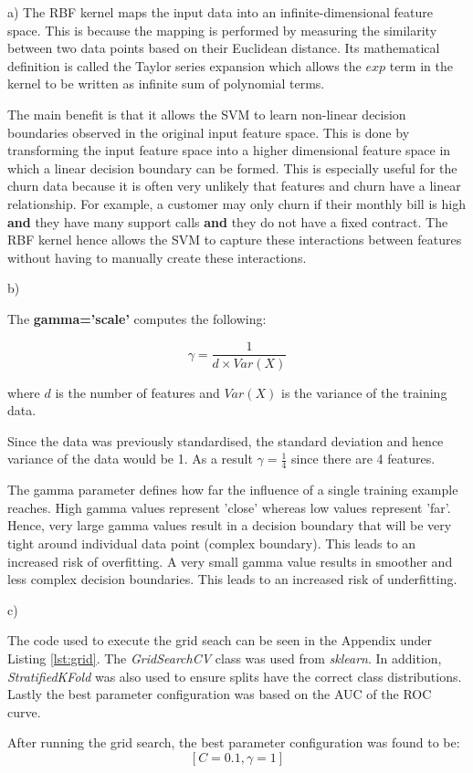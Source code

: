 \begin{partquestion2}{a)} The RBF kernel maps the input data into an infinite-dimensional feature space. This is because
the mapping is performed by measuring the similarity between two data points based on their
Euclidean distance. Its mathematical definition is called the Taylor series expansion which allows
the $exp$ term in the kernel to be written as infinite sum of polynomial terms.

The main benefit is that it allows the SVM to learn non-linear decision boundaries observed in the
original input feature space. This is done by transforming the input feature space into a higher
dimensional feature space in which a linear decision boundary can be formed. This is especially
useful for the churn data because it is often very unlikely that features and churn have a 
linear relationship. For example, a customer may only churn if their monthly bill is high \textbf{and}
they have many support calls \textbf{and} they do not have a fixed contract. The RBF kernel
hence allows the SVM to capture these interactions between features without having to manually
create these interactions.
\end{partquestion2}

\begin{partquestion2}{b)}

The \textbf{gamma='scale'} computes the following:

\[\gamma = \frac{1}{d \times Var(X)}\]

where $d$ is the number of features and $Var(X)$ is the variance of the training data.

Since the data was previously standardised, the standard deviation and hence variance of the
data would be 1. As a result $\gamma = \frac{1}{4}$ since there are 4 features.

The gamma parameter defines how far the influence of a single training example reaches. High gamma
values represent 'close' whereas low values represent 'far'. Hence, very large gamma values
result in a decision boundary that will be very tight around individual data point (complex boundary). This leads
to an increased risk of overfitting. A very small gamma value results in smoother and less complex decision boundaries. This
leads to an increased risk of underfitting.
\end{partquestion2}

\begin{partquestion2}{c)}

The code used to execute the grid seach can be seen in the Appendix under Listing \ref{lst:grid}. The \emph{GridSearchCV}
class was used from \emph{sklearn}. In addition, \emph{StratifiedKFold} was also used
to ensure splits have the correct class distributions. Lastly the best parameter configuration
was based on the AUC of the ROC curve.

After running the grid search, the best parameter configuration was found to be:
\[[C = 0.1, \gamma = 1]\]
\end{partquestion2}